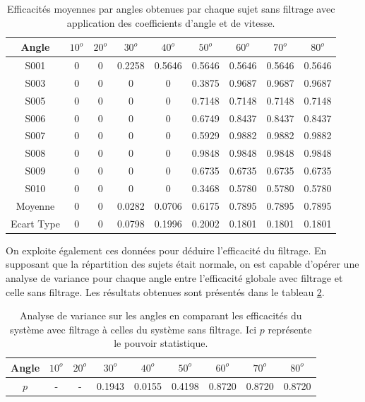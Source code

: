 \documentclass[letterpaper, twoside, 12pt, memoire, creativecommons, hyperref]{thETS}
\begin{document}
\begin{table}[ht]
	\caption{Efficacités moyennes par angles obtenues par chaque sujet sans filtrage avec application des coefficients d'angle et de vitesse. }
		\begin{tabular}{|c|c|c|c|c|c|c|c|c|}
		\hline
			Angle & $10^{o}$ & $20^{o}$ & $30^{o}$ & $40^{o}$ & $50^{o}$ & $60^{o}$ & $70^{o}$ & $80^{o}$\\
	    \hline
	    		S001 & 0 & 0 & 0.2258 & 0.5646 & 0.5646 & 0.5646 & 0.5646 & 0.5646\\
	    \hline
	    		S003 & 0 & 0 & 0 & 0 & 0.3875 & 0.9687 & 0.9687 & 0.9687\\
	    \hline
	    		S005 & 0 & 0 & 0 & 0 & 0.7148 & 0.7148 & 0.7148 & 0.7148\\
	    \hline
	    		S006 & 0 & 0 & 0 & 0 & 0.6749 & 0.8437 & 0.8437 & 0.8437\\
	    \hline
	    		S007 & 0 & 0 & 0 & 0 & 0.5929 & 0.9882 & 0.9882 & 0.9882\\
	    \hline
	    		S008 & 0 & 0 & 0 & 0 & 0.9848 & 0.9848 & 0.9848 & 0.9848\\
	    \hline
	    		S009 & 0 & 0 & 0 & 0 & 0.6735 & 0.6735 & 0.6735 & 0.6735\\
	    \hline
	    		S010 & 0 & 0 & 0 & 0 & 0.3468 & 0.5780 & 0.5780 & 0.5780\\
	    \hline
	    		Moyenne & 0 & 0 & 0.0282 & 0.0706 & 0.6175 & 0.7895 & 0.7895 & 0.7895\\
	    \hline
	    		Ecart Type & 0 & 0 & 0.0798 & 0.1996 & 0.2002 & 0.1801 & 0.1801 & 0.1801\\
	    \hline
		\end{tabular}
	\label{tab:effFanglecoeff}
\end{table}

On exploite également ces données pour déduire l'efficacité du filtrage. En supposant que la répartition des sujets était normale, on est capable d'opérer une analyse de variance pour chaque angle entre l'efficacité globale avec filtrage et celle sans filtrage. Les résultats obtenues sont présentés dans le tableau \ref{tab:anova}. 

\begin{table}[ht]
	\caption{Analyse de variance sur les angles en comparant les efficacités du système avec filtrage à celles du système sans filtrage. Ici $p$ représente le pouvoir statistique.}
		\begin{tabular}{|c|c|c|c|c|c|c|c|c|}
		\hline
			Angle & $10^{o}$ & $20^{o}$ & $30^{o}$ & $40^{o}$ & $50^{o}$ & $60^{o}$ & $70^{o}$ & $80^{o}$\\
	    \hline
	    		$p$ &  - & - & 0.1943 & 0.0155 & 0.4198 & 0.8720 & 0.8720 & 0.8720\\
	    \hline
		\end{tabular}
	\label{tab:anova}
\end{table}
\end{document}
